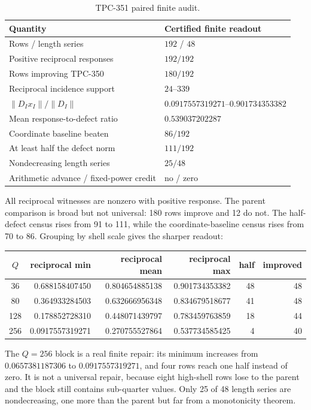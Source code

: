 \documentclass[10pt]{article}
\begin{document}
\begin{table}[t]
\centering
\small
\caption{TPC-351 paired finite audit.}
\label{tab:summary}
\begin{tabular}{@{}ll@{}}
\toprule
Quantity & Certified finite readout\\
\midrule
Rows / length series & $192$ / $48$\\
Positive reciprocal responses & $192/192$\\
Rows improving TPC-350 & $180/192$\\
Reciprocal incidence support & $24$--$339$\\
$\|D_Ix_I\|/\|D_I\|$ & $0.0917557319271$--$0.901734353382$\\
Mean response-to-defect ratio & $0.539037202287$\\
Coordinate baseline beaten & $86/192$\\
At least half the defect norm & $111/192$\\
Nondecreasing length series & $25/48$\\
Arithmetic advance / fixed-power credit & no / zero\\
\bottomrule
\end{tabular}
\end{table}

All reciprocal witnesses are nonzero with positive response.  The parent
comparison is broad but not universal: 180 rows improve and 12 do not.  The
half-defect census rises from 91 to 111, while the coordinate-baseline census
rises from 70 to 86.  Grouping by shell scale gives the sharper readout:

\begin{center}
\begin{tabular}{@{}c r r r r r@{}}
\toprule
$Q$ & reciprocal min & reciprocal mean & reciprocal max & half & improved\\
\midrule
36  & 0.688158407450 & 0.804654885138 & 0.901734353382 & 48 & 48\\
80  & 0.364933284503 & 0.632666956348 & 0.834679518677 & 41 & 48\\
128 & 0.178852728310 & 0.448071439797 & 0.783459763859 & 18 & 44\\
256 & 0.0917557319271 & 0.270755527864 & 0.537734585425 & 4 & 40\\
\bottomrule
\end{tabular}
\end{center}

The $Q=256$ block is a real finite repair: its minimum increases from
$0.0657381187306$ to $0.0917557319271$, and four rows reach one half instead
of zero.  It is not a universal repair, because eight high-shell rows lose to
the parent and the block still contains sub-quarter values.  Only 25 of 48
length series are nondecreasing, one more than the parent but far from a
monotonicity theorem.
\end{document}
